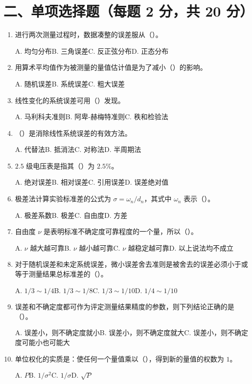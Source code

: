 \documentclass[UTF8,12pt,a4paper]{ctexart}
\begin{document}
\newpage

\section*{二、单项选择题（每题 2 分，共 20 分）}
\begin{enumerate}[label=\arabic*、]
\item 进行两次测量过程时，数据凑整的误差服从（\quad）。
\par\noindent A. 均匀分布\quad B. 三角误差\quad C. 反正弦分布\quad D. 正态分布
\item 用算术平均值作为被测量的量值估计值是为了减小（\quad）的影响。
\par\noindent A. 随机误差\quad B. 系统误差\quad C. 粗大误差
\item 线性变化的系统误差可用（\quad）发现。
\par\noindent A. 马利科夫准则\quad B. 阿卑-赫梅特准则\quad C. 秩和检验法
\item （\quad）是消除线性系统误差的有效方法。
\par\noindent A. 代替法\quad B. 抵消法\quad C. 对称法\quad D. 半周期法
\item $2.5$ 级电压表是指其（\quad）为 $2.5\%$。
\par\noindent A. 绝对误差\quad B. 相对误差\quad C. 引用误差\quad D. 误差绝对值
\item 极差法计算实验标准差的公式为 $\sigma=\omega_n/d_n$，其式中 $\omega_n$ 表示（\quad）。
\par\noindent A. 极差系数\quad B. 极差\quad C. 自由度\quad D. 方差
\item 自由度 $\nu$ 是表明标准不确定度可靠程度的一个量，所以（\quad）。
\par\noindent A. $\nu$ 越大越可靠\quad B. $\nu$ 越小越可靠\quad C. $\nu$ 越稳定越可靠\quad D. 以上说法均不成立
\item 对于随机误差和未定系统误差，微小误差舍去准则是被舍去的误差必须小于或等于测量结果总标准差的（\quad）。
\par\noindent A. $1/3\sim1/4$\quad B. $1/3\sim1/8$\quad C. $1/3\sim1/10$\quad D. $1/4\sim1/10$
\item 误差和不确定度都可作为评定测量结果精度的参数，则下列结论正确的是（\quad）。
\par\noindent A. 误差小，则不确定度就小\quad B. 误差小，则不确定度就大\quad C. 误差小，则不确定度可能小也可能大
\item 单位权化的实质是：使任何一个量值乘以（\quad），得到新的量值的权数为 $1$。
\par\noindent A. $P$\quad B. $1/\sigma^2$\quad C. $1/\sigma$\quad D. $\sqrt{P}$
\end{enumerate}
\end{document}
